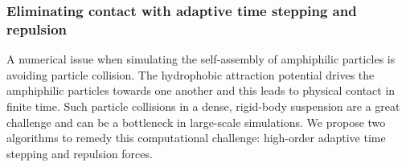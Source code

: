 

\subsubsection{Eliminating contact with adaptive time stepping and
repulsion}
\label{subsec:timeStepping}

A numerical issue when simulating the self-assembly of amphiphilic
particles is avoiding particle collision. The hydrophobic attraction
potential drives the amphiphilic particles towards one another and
this leads to physical contact in
finite time. Such particle collisions in a dense, rigid-body suspension
are a great challenge and can be a bottleneck in large-scale simulations.
We propose two algorithms to remedy this computational challenge:
high-order adaptive time stepping and repulsion forces.

